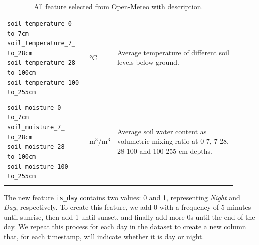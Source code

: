\begin{longtable}[c]{p{0.3\linewidth}|p{0.07\linewidth}| p{0.54\linewidth}}
	\verb|soil_temperature_0_| \verb|   to_7cm| \verb|soil_temperature_7_| \verb|   to_28cm| \verb|soil_temperature_28_| \verb|   to_100cm| \verb|soil_temperature_100_| \verb|   to_255cm| & °C                      & Average temperature of different soil levels below ground.                                                                                                                                                                                                                                             \\
	                                                                                                                                                                                        &                         &                                                                                                                                                                                                                                                                                                        \\
	\verb|soil_moisture_0_| \verb|   to_7cm| \verb|soil_moisture_7_| \verb|   to_28cm| \verb|soil_moisture_28_| \verb|   to_100cm| \verb|soil_moisture_100_| \verb|   to_255cm|             & $\text{m}^3/\text{m}^3$ & Average soil water content as volumetric mixing ratio at 0-7, 7-28, 28-100 and 100-255 cm depths.                                                                                                                                                                                                      \\
	\caption{All feature selected from Open-Meteo with description\cite{openmeteo}.}\label{tab:openmeteofeatures}
\end{longtable}

The new feature \texttt{is\_day} contains two values: 0 and 1,
representing \textit{Night} and \textit{Day}, respectively.
To create this feature, we add 0 with a frequency of 5 minutes until sunrise,
then add 1 until sunset, and finally add more 0s until the end of the day.
We repeat this process for each day in the dataset to create a new column that,
for each timestamp, will indicate whether it is day or night.



